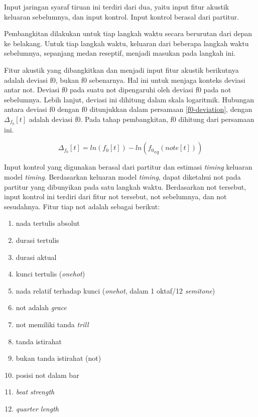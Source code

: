 Input jaringan syaraf tiruan ini terdiri dari dua, yaitu input fitur akustik keluaran sebelumnya, dan input kontrol. Input kontrol berasal dari partitur.

Pembangkitan dilakukan untuk tiap langkah waktu secara berurutan dari depan ke belakang. Untuk tiap langkah waktu, keluaran dari beberapa langkah waktu sebelumnya, sepanjang medan reseptif, menjadi masukan pada langkah ini.

Fitur akustik yang dibangkitkan dan menjadi input fitur akustik berikutnya adalah deviasi f0, bukan f0 sebenarnya. Hal ini untuk menjaga konteks deviasi antar not. Deviasi f0 pada suatu not dipengaruhi oleh deviasi f0 pada not sebelumnya. Lebih lanjut, deviasi ini dihitung dalam skala logaritmik. Hubungan antara deviasi f0 dengan f0 ditunjukkan dalam persamaan \ref{f0-deviation}, dengan $\Delta_{f_0}[t]$ adalah deviasi f0. Pada tahap pembangkitan, f0 dihitung dari persamaan ini.

\begin{equation}
    \Delta_{f_0}[t] = ln(f_0[t]) - ln({f_0}_{eq}(note[t]))
\end{equation}\label{f0-deviation}

Input kontrol yang digunakan berasal dari partitur dan estimasi \textit{timing} keluaran model \textit{timing}. Berdasarkan keluaran model \textit{timing}, dapat diketahui not pada partitur yang dibunyikan pada satu langkah waktu. Berdasarkan not tersebut, input kontrol ini terdiri dari fitur not tersebut, not sebelumnya, dan not sesudahnya. Fitur tiap not adalah sebagai berikut:

\begin{enumerate}
  \item nada tertulis absolut 
  \item durasi tertulis
  \item durasi aktual
  \item kunci tertulis (\textit{onehot})
  \item nada relatif terhadap kunci (\textit{onehot}, dalam 1 oktaf/12 \textit{semitone})
  \item not adalah \textit{grace}
  \item not memiliki tanda \textit{trill}
  \item tanda istirahat
  \item bukan tanda istirahat (not)
  \item posisi not dalam bar
  \item \textit{beat strength}
  \item \textit{quarter length}
\end{enumerate}

